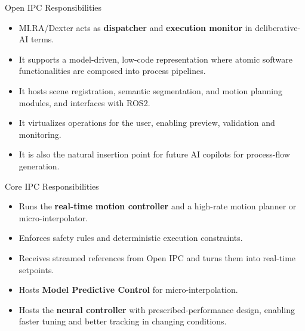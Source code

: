 \documentclass[aspectratio=169,10pt]{beamer}
\begin{document}
\begin{frame}{Open IPC Responsibilities}

\small
\begin{itemize}
  \item MI.RA/Dexter acts as \textbf{dispatcher} and \textbf{execution monitor} in deliberative-AI terms.
  \item It supports a model-driven, low-code representation where atomic software functionalities are composed into process pipelines.
  \item It hosts scene registration, semantic segmentation, and motion planning modules, and interfaces with ROS2.
  \item It virtualizes operations for the user, enabling preview, validation and monitoring.
  \item It is also the natural insertion point for future AI copilots for process-flow generation.
\end{itemize}

\end{frame}


\begin{frame}{Core IPC Responsibilities}

\small
\begin{itemize}
  \item Runs the \textbf{real-time motion controller} and a high-rate motion planner or micro-interpolator.
  \item Enforces safety rules and deterministic execution constraints.
  \item Receives streamed references from Open IPC and turns them into real-time setpoints.
  \item Hosts \textbf{Model Predictive Control} for micro-interpolation.
  \item Hosts the \textbf{neural controller} with prescribed-performance design, enabling faster tuning and better tracking in changing conditions.
\end{itemize}

\end{frame}
\end{document}
